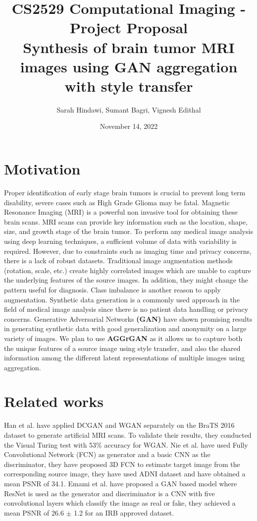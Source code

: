 \documentclass[10pt]{extarticle}
\title{
    {\large CS2529 Computational Imaging - Project Proposal} \\
    Synthesis of brain tumor MRI images using GAN aggregation with style transfer
}
\author{Sarah Hindawi, Sumant Bagri, Vignesh Edithal}
\date{November 14, 2022}
\begin{document}
\maketitle

\section{Motivation}

\cite{Mukherkjee2022} Proper identification of early stage brain tumors is crucial to prevent long term disability, severe 
cases such as High Grade Glioma may be fatal. Magnetic Resonance Imaging (MRI) is a powerful non invasive tool for obtaining 
these brain scans. MRI scans can provide key information such as the location, shape, size, and growth stage of the brain 
tumor. To perform any medical image analysis using deep learning techniques, a sufficient volume of data with variability is 
required. However, due to constraints such as imaging time and privacy concerns, there is a lack of robust datasets. 
Traditional image augmentation methods (rotation, scale, etc.) create highly correlated images which are unable to capture 
the underlying features of the source images. In addition, they might change the pattern useful for diagnosis. Class 
imbalance is another reason to apply augmentation. Synthetic data generation is a commonly used approach in the field of 
medical image analysis since there is no patient data handling or privacy concerns. Generative Adversarial Networks \textbf{(GAN)} have shown promising results in generating synthetic data with good generalization and anonymity on a large variety 
of images. We plan to use \textbf{AGGrGAN} \cite{Mukherkjee2022} as it allows us to capture both the unique features of a 
source image using style transfer, and also the shared information among the different latent representations of multiple 
images using aggregation.

\section{Related works}

\cite{Mukherkjee2022} Han et al. \cite{Han2018} have applied DCGAN and WGAN separately on the BraTS 2016 dataset to generate artificial MRI scans. To validate their results, they conducted the Visual Turing test with 53\% accuracy for WGAN. Nie et al. \cite{Nie2018} have used Fully Convolutional Network (FCN) as generator and a basic CNN as the discriminator, they have proposed 3D FCN to estimate target image from the corresponding source image, they have used ADNI dataset and have obtained a mean PSNR of 34.1. Emami et al. \cite{Emami2018} have proposed a GAN based model where ResNet is used as the generator and discriminator is a CNN with five convolutional layers which classify the image as real or fake, they achieved a mean PSNR of 26.6 $\pm$ 1.2 for an IRB approved dataset.
\end{document}
